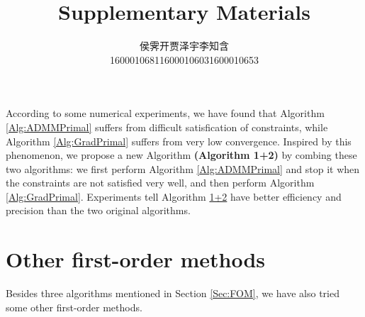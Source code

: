 \documentclass[english]{pkupaper}
\begin{document}
According to some numerical experiments, we have found that Algorithm \ref{Alg:ADMMPrimal} suffers from difficult satisfication of constraints, while Algorithm \ref{Alg:GradPrimal} suffers from very low convergence. Inspired by this phenomenon, we propose a new Algorithm \textbf{(Algorithm \hypertarget{EAlg:12}{1+2})} by combing these two algorithms: we first perform Algorithm \ref{Alg:ADMMPrimal} and stop it when the constraints are not satisfied very well, and then perform Algorithm \ref{Alg:GradPrimal}. Experiments tell Algorithm \hyperlink{EAlg:12}{1+2} have better efficiency and precision than the two original algorithms.

\newpage
\cleanthanks

\DeclareRobustCommand{\authorthing}{%
\begin{tabular}{ccc}%
侯霁开 & 贾泽宇 & 李知含\\%
1600010681 & 1600010603 & 1600010653%
\end{tabular}%
}
\title{Supplementary Materials}
\author{\authorthing}

\maketitle

\section{Other first-order methods}

Besides three algorithms mentioned in Section \ref{Sec:FOM}, we have also tried some other first-order methods.
\end{document}
